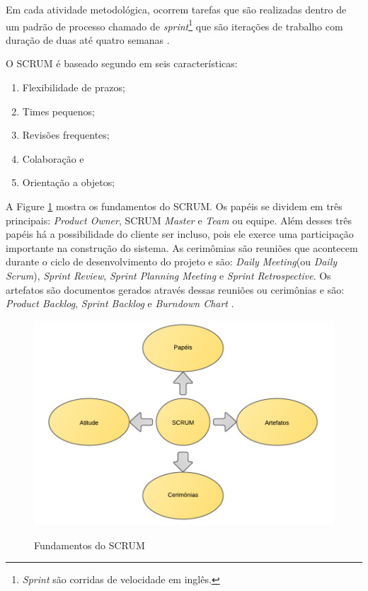 Em cada atividade metodológica, ocorrem tarefas que são realizadas dentro de um padrão de processo chamado de \textit{sprint}\footnote{\textit{Sprint} são corridas de velocidade em inglês.} que são iterações de trabalho com duração de duas até quatro semanas \cite{pressman:11}. 

O SCRUM é baseado segundo  em seis características:

\begin{enumerate}
	\item Flexibilidade de prazos;
	\item Times pequenos;
	\item Revisões frequentes;
	\item Colaboração e
	\item Orientação a objetos;
\end{enumerate}

A Figure \ref{fig:scrumfund} mostra os fundamentos do SCRUM. Os papéis se dividem em três principais: \textit{Product Owner}, SCRUM \textit{Master} e \textit{Team} ou equipe. Além desses três papéis há a possibilidade do cliente ser incluso, pois ele exerce uma participação importante na construção do sistema. As cerimômias são reuniões que acontecem durante o ciclo de desenvolvimento do projeto e são: \textit{Daily Meeting}(ou \textit{Daily Scrum}), \textit{Sprint Review}, \textit{Sprint Planning Meeting} e \textit{Sprint Retrospective}. Os artefatos são documentos gerados através dessas reuniões ou cerimônias e são: \textit{Product Backlog}, \textit{Sprint Backlog} e \textit{Burndown Chart} \cite{macedo:12}. 

\begin{figure}[htb!]
\begin{center}
\caption{Fundamentos do SCRUM}
\label{fig:scrumfund}
\includegraphics[width=13cm]{assets/scrum_papeis} \\
\end{center}
\end{figure}

